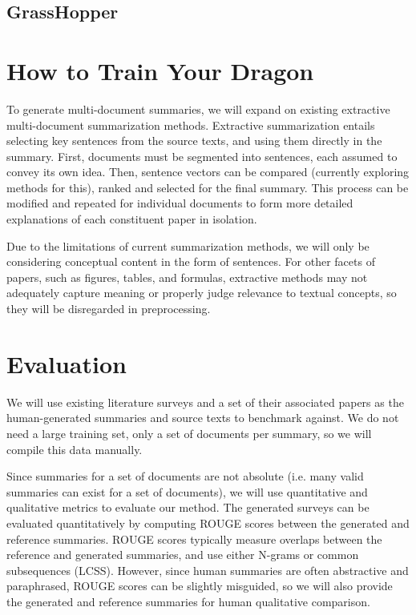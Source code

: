 \documentclass[conference]{sig-alternate-05-2015}
\begin{document}
\subsection{GrassHopper}

\section{How to Train Your Dragon}\label{sec:design}

To generate multi-document summaries, we will expand on existing extractive multi-document summarization 
methods. Extractive summarization entails selecting key sentences from the source texts, and using them directly in the 
summary. First, documents must be segmented into sentences, each assumed to convey its own idea. Then, sentence vectors can be 
compared (currently exploring methods for this), ranked and selected for the final summary. This process can be modified 
and repeated for individual documents to form more detailed explanations of each constituent paper in isolation.

Due to the limitations of current summarization methods, we will only be considering 
conceptual content in the form of sentences. For other facets of papers, such as figures, tables, and formulas, extractive 
methods may not adequately capture meaning or properly judge relevance to textual concepts, so they will be 
disregarded in preprocessing.


\section{Evaluation}\label{sec:evaluation}

We will use existing literature surveys and a set of their associated papers as the human-generated 
summaries and source texts to benchmark against. We do not need a large training set, only a set of documents per summary, 
so we will compile this data manually.

Since summaries for a set of documents are not absolute (i.e. many valid summaries can exist for a set of documents), 
we will use quantitative and qualitative metrics to evaluate our method. The generated surveys can be evaluated quantitatively 
by computing ROUGE \cite{rouge} scores between the generated and reference summaries. ROUGE scores typically measure 
overlaps between the reference and generated summaries, and use either N-grams or common subsequences (LCSS). However, 
since human summaries are often abstractive and paraphrased, ROUGE scores can be slightly misguided, so we will also 
provide the generated and reference summaries for human qualitative comparison.
\end{document}
